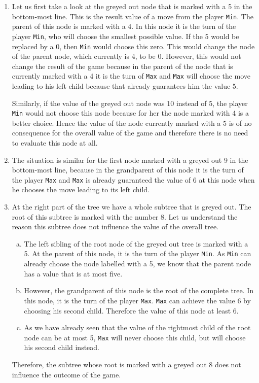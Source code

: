 \begin{enumerate}
\item Let us first take a look at the greyed out node that is marked with a 5 in the bottom-most line.  This is the
      result value of a move from the player \texttt{Min}.   The parent of this node is marked with a 4.  In
      this node it is the turn of the player \texttt{Min}, who will choose the smallest possible value.  If the 5
      would be replaced by a 0, then \texttt{Min} would choose this zero.  This would change the node of the
      parent node, which currently is 4, to be 0.  However, this would not change the result of the game because
      in the parent of the node that is currently marked with a 4 it is the turn of \texttt{Max} and
      \texttt{Max} will choose the move leading to his left child because that already guarantees him the value 5.

      Similarly, if the value of the greyed out node was 10 instead of 5, the player \texttt{Min} would not
      choose this node because for her the node marked with 4 is a better choice.  Hence the value of the node
      currently marked with a 5 is of no consequence for the overall value of the game and therefore there is no
      need to evaluate this node at all.
\item The situation is similar for the first node marked with a greyed out 9 in the bottom-most line, because
      in the grandparent of this node it is the turn of the player \texttt{Max} and \texttt{Max} is already
      guaranteed the value of 6 at this node when he chooses the move leading to its left child.
\item At the right part of the tree we have a whole subtree that is greyed out.  The root of this subtree is
      marked with the number 8.  Let us understand the reason this subtree does not influence the value of the
      overall tree.
      \begin{enumerate}[(a)]
      \item The left sibling of the root node of the greyed out tree is marked with a 5. At the parent of this
            node, it is the turn of the player \texttt{Min}.  As \texttt{Min} can already choose the node
            labelled with a 5, we know that the parent node has a value that is at most five.
      \item However, the grandparent of this node is the root of the complete tree.  In this node, it is the
            turn of the player \texttt{Max}.  \texttt{Max} can achieve the value 6 by choosing his second child.
            Therefore the value of this node at least 6.  
      \item As we have already seen that the value of the rightmost child of the root node can be at most 5,
            \texttt{Max} will never choose this child, but will choose his second child instead.
      \end{enumerate}
      Therefore, the subtree whose root is marked with a greyed out 8 does not influence the outcome of the game.
\end{enumerate}
